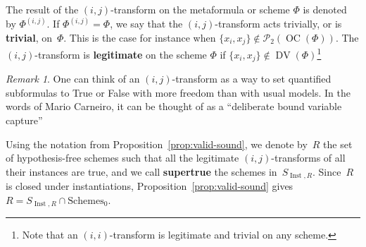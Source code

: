 \documentclass[11pt]{article}
\newcommand*{\define}[1]{\textbf{#1}}%
\newcommand*{\calP}{\mathcal{P}}
\DeclareMathOperator{\DV}{DV}
\DeclareMathOperator{\OC}{OC}
\newcommand*{\Schemes}{\mathrm{Schemes}}
\newcommand*{\Schemeshypfree}{{\Schemes_0}}
\DeclareMathOperator{\Inst}{Inst}
\theoremstyle{plain}
\theoremstyle{definition}
\theoremstyle{remark}
\newtheorem{remark}[theorem]{Remark}
\begin{document}
The result of the $(i, j)$-transform on the metaformula or scheme $\Phi$ is denoted by $\Phi^{(i, j)}$.
If $\Phi^{(i, j)} = \Phi$, we say that the $(i, j)$-transform acts trivially, or is \define{trivial}, on~$\Phi$.
This is the case for instance when $\{x_i, x_j\} \notin \calP_2(\OC(\Phi))$.
The $(i, j)$-transform is \define{legitimate} on the scheme $\Phi$ if $\{x_i, x_j\} \notin \DV(\Phi)$\footnote{Note that an $(i, i)$-transform is legitimate and trivial on any scheme.}

\begin{remark}
One can think of an $(i, j)$-transform as a way to set quantified subformulas to True or False with more freedom than with usual models.
In the words of Mario Carneiro, it can be thought of as a ``deliberate bound variable capture''
\end{remark}

Using the notation from Proposition~\ref{prop:valid-sound}, we denote by~$R$ the set of
hypothesis-free schemes such that all the legitimate $(i, j)$-transforms of all their instances
are true, and we call \define{supertrue} the schemes in~$S_{\Inst, R}$.
Since~$R$ is closed under instantiations, Proposition~\ref{prop:valid-sound} gives
$R = S_{\Inst, R} \cap \Schemeshypfree$.
\end{document}
